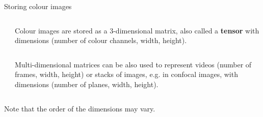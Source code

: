 \documentclass[9pt, aspectratio=169]{beamer}
\begin{document}
\begin{frame}
    {Storing colour images}
    \begin{columns}
        \begin{column}{.3\textwidth}
        \end{column}
        \begin{column}{0.7\textwidth}
            Colour images are stored as a 3-dimensional matrix, also called a \textbf{tensor} with dimensions (number of colour channels, width, height).
        \end{column}
    \end{columns}
    \vspace{2em}
    \pause
    \begin{columns}
        \begin{column}{0.3\textwidth}
        \end{column}
        \begin{column}{0.7\textwidth}
            Multi-dimensional matrices can be also used to represent videos (number of frames, width, height) or stacks of images, e.g. in confocal images, with dimensions (number of planes, width, height).
        \end{column}
    \end{columns}

    Note that the order of the dimensions may vary.
\end{frame}
\end{document}
